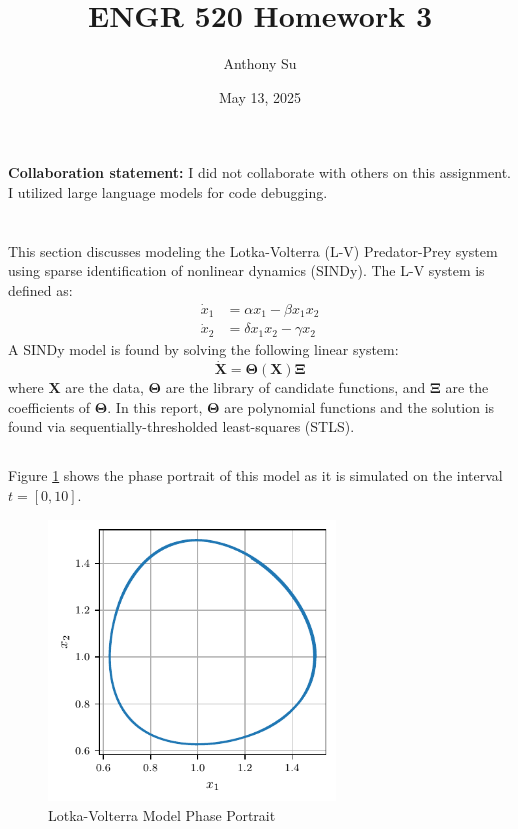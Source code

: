\documentclass[11pt]{article}
\title{ENGR 520 Homework 3}
\author{Anthony Su}
\date{May 13, 2025}
\begin{document}
\thispagestyle{plain}
\maketitle

\textbf{Collaboration statement:} I did not collaborate with others on this assignment. I utilized large
language models for code debugging.

\section{}

This section discusses modeling the Lotka-Volterra (L-V) Predator-Prey system using sparse identification of nonlinear dynamics (SINDy). The L-V system is defined as:
\begin{align*}
    \dot{x}_1 &= \alpha x_1 - \beta x_1 x_2 \\
    \dot{x}_2 &= \delta x_1 x_2 - \gamma x_2
\end{align*}
A SINDy model is found by solving the following linear system:
\begin{equation*}
    \dot{\mathbf{X}} = \mathbf{\Theta}(\mathbf{X}) \mathbf{\Xi}
\end{equation*}
where $\mathbf{X}$ are the data, $\mathbf{\Theta}$ are the library of candidate functions, and $\mathbf{\Xi}$ are the coefficients of $\mathbf{\Theta}$. In this report, $\mathbf{\Theta}$ are polynomial functions and the solution is found via sequentially-thresholded least-squares (STLS).


\subsection{} %

Figure \ref{p1afig1} shows the phase portrait of this model as it is simulated on the interval $t=[0, 10]$.

\begin{figure}[H]
    \centering
    \includegraphics[width=3in]{p1fig1.pdf}
    \caption{Lotka-Volterra Model Phase Portrait}
    \label{p1afig1}
\end{figure}
\end{document}
